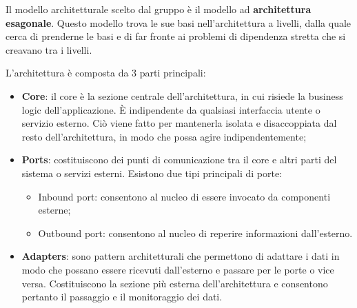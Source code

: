 \par Il modello architetturale scelto dal gruppo è il modello ad \textbf{architettura esagonale}. Questo modello trova le sue basi nell'architettura a livelli, dalla quale cerca di prenderne le basi e di far fronte ai problemi di dipendenza stretta che si creavano tra i livelli.
\par L'architettura è composta da 3 parti principali:
\begin{itemize}
    \item \textbf{Core}: il core è la sezione centrale dell'architettura, in cui risiede la business logic dell'applicazione. È indipendente da qualsiasi interfaccia utente o servizio esterno. Ciò viene fatto per mantenerla isolata e disaccoppiata dal resto dell'architettura, in modo che possa agire indipendentemente;
    \item \textbf{Ports}: costituiscono dei punti di comunicazione tra il core e altri parti del sistema o servizi esterni. Esistono due tipi principali di porte:
    \begin{itemize}
        \item Inbound port: consentono al nucleo di essere invocato da componenti esterne;
        \item Outbound port: consentono al nucleo di reperire informazioni dall'esterno.
    \end{itemize}
    \item \textbf{Adapters}: sono pattern architetturali che permettono di adattare i dati in modo che possano essere ricevuti dall'esterno e passare per le porte o vice versa. Costituiscono la sezione più esterna dell'architettura e consentono pertanto il passaggio e il monitoraggio dei dati.
\end{itemize}

